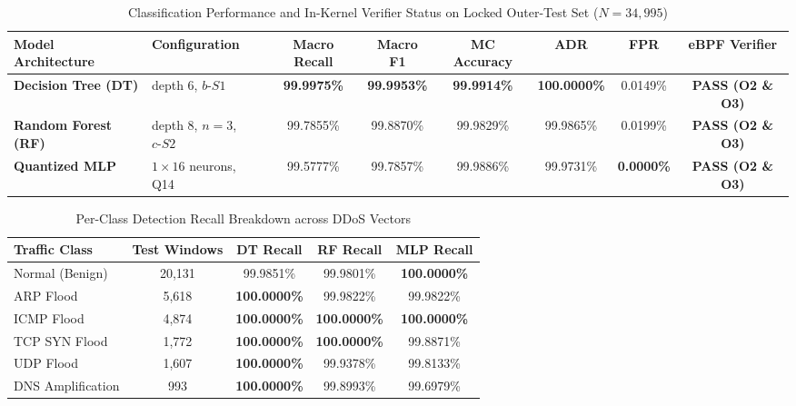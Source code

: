 
\begin{table}[t]
\centering
\caption{Classification Performance and In-Kernel Verifier Status on Locked Outer-Test Set ($N = 34,995$)}
\label{tab:overall_performance}
\begin{tabular}{llcccccc}
\toprule
\textbf{Model Architecture} & \textbf{Configuration} & \textbf{Macro Recall} & \textbf{Macro F1} & \textbf{MC Accuracy} & \textbf{ADR} & \textbf{FPR} & \textbf{eBPF Verifier} \\
\midrule
\textbf{Decision Tree (DT)} & depth 6, $b\text{-}S1$ & \textbf{99.9975\%} & \textbf{99.9953\%} & \textbf{99.9914\%} & \textbf{100.0000\%} & 0.0149\% & \textbf{PASS (O2 \& O3)} \\
\textbf{Random Forest (RF)} & depth 8, $n=3$, $c\text{-}S2$ & 99.7855\% & 99.8870\% & 99.9829\% & 99.9865\% & 0.0199\% & \textbf{PASS (O2 \& O3)} \\
\textbf{Quantized MLP}      & $1\times 16$ neurons, Q14 & 99.5777\% & 99.7857\% & 99.9886\% & 99.9731\% & \textbf{0.0000\%} & \textbf{PASS (O2 \& O3)} \\
\bottomrule
\end{tabular}
\end{table}

\begin{table}[t]
\centering
\caption{Per-Class Detection Recall Breakdown across DDoS Vectors}
\label{tab:per_class_recall}
\begin{tabular}{lcccc}
\toprule
\textbf{Traffic Class} & \textbf{Test Windows} & \textbf{DT Recall} & \textbf{RF Recall} & \textbf{MLP Recall} \\
\midrule
Normal (Benign)        & 20,131 & 99.9851\% & 99.9801\% & \textbf{100.0000\%} \\
ARP Flood              & 5,618  & \textbf{100.0000\%} & 99.9822\% & 99.9822\% \\
ICMP Flood             & 4,874  & \textbf{100.0000\%} & \textbf{100.0000\%} & \textbf{100.0000\%} \\
TCP SYN Flood          & 1,772  & \textbf{100.0000\%} & \textbf{100.0000\%} & 99.8871\% \\
UDP Flood              & 1,607  & \textbf{100.0000\%} & 99.9378\% & 99.8133\% \\
DNS Amplification      & 993    & \textbf{100.0000\%} & 99.8993\% & 99.6979\% \\
\bottomrule
\end{tabular}
\end{table}

